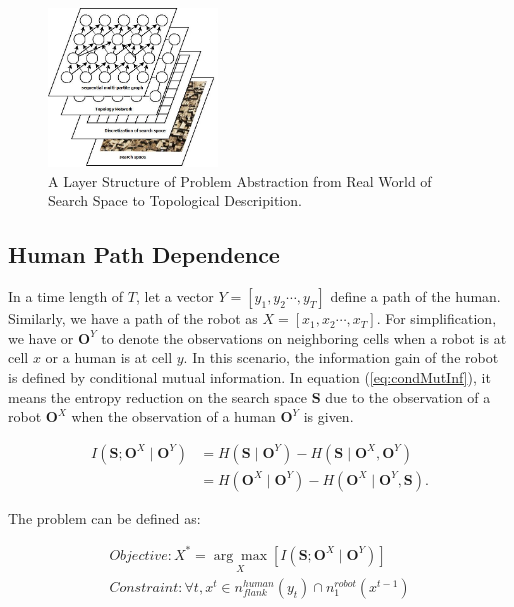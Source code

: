 \documentclass[12pt]{article}
\begin{document}
\begin{figure}[htbp]
\centering
\includegraphics[width=0.4\textwidth]{./images/LayerStructure}
\caption{A Layer Structure of Problem Abstraction from Real World of Search Space to Topological Descripition.}
\label{fig:LayerStructure}
\end{figure}

\subsection{Human Path Dependence}

In a time length of $ T $, let a vector $ Y = [y_{1}, y_{2} \cdots , y_{T}] $ define a path of the human. Similarly, we have a path of the robot as $ X = [x_{1}, x_{2} \cdots, x_{T}] $. For simplification, we have   or $ \textbf{O}^{Y} $ to denote the observations on neighboring cells when a robot is at cell $ x $ or a human is at cell $ y $. In this scenario, the information gain of the robot is defined by conditional mutual information. In equation (\ref{eq:condMutInf}), it means the entropy reduction on the search space $ \textbf{S} $ due to the observation of a robot $ \textbf{O}^{X} $ when the observation of a human $ \textbf{O}^{Y} $ is given.

\begin{equation}
\label{eq:condMutInf}
\begin{aligned}
I(\textbf{S}; \textbf{O}^{X} \mid \textbf{O}^{Y}) & = H(\textbf{S} \mid \textbf{O}^{Y}) - H(\textbf{S} \mid \textbf{O}^{X},\textbf{O}^{Y})\\
& = H(\textbf{O}^{X} \mid \textbf{O}^{Y}) - H(\textbf{O}^{X} \mid \textbf{O}^{Y}, \textbf{S}).
\end{aligned}
\end{equation}

The problem can be defined as:

\begin{equation}
\label{eq:objFunc}
\begin{aligned}
Objective: X^{*} = \underset{X}{\arg\max} [I(\textbf{S}; \textbf{O}^{X} \mid \textbf{O}^{Y})] \\
Constraint: \forall t, x^{t} \in n^{human}_{flank}(y_{t}) \cap n^{robot}_{1}(x^{t-1}) 
\end{aligned}
\end{equation}
\end{document}
